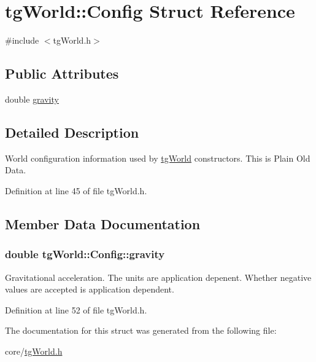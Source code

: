 \hypertarget{structtg_world_1_1_config}{\section{tg\-World\-:\-:Config Struct Reference}
\label{structtg_world_1_1_config}
}


{\ttfamily \#include $<$tg\-World.\-h$>$}

\subsection*{Public Attributes}
\begin{DoxyCompactItemize}
\item 
double \hyperlink{structtg_world_1_1_config_a637c1cb122842263847ccf5e84feb854}{gravity}
\end{DoxyCompactItemize}


\subsection{Detailed Description}
World configuration information used by \hyperlink{classtg_world}{tg\-World} constructors. This is Plain Old Data. 

Definition at line 45 of file tg\-World.\-h.



\subsection{Member Data Documentation}
\hypertarget{structtg_world_1_1_config_a637c1cb122842263847ccf5e84feb854}{
\subsubsection[{gravity}]{\setlength{\rightskip}{0pt plus 5cm}double tg\-World\-::\-Config\-::gravity}}\label{structtg_world_1_1_config_a637c1cb122842263847ccf5e84feb854}
Gravitational acceleration. The units are application depenent. Whether negative values are accepted is application dependent. 

Definition at line 52 of file tg\-World.\-h.



The documentation for this struct was generated from the following file\-:\begin{DoxyCompactItemize}
\item 
core/\hyperlink{tg_world_8h}{tg\-World.\-h}\end{DoxyCompactItemize}
